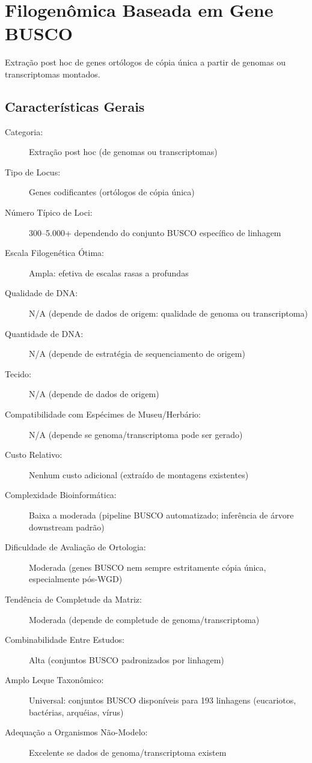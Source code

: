 \textcite{jansen2007, smith2015, twyford2017, li2021}

\section{Filogenômica Baseada em Gene BUSCO}

Extração post hoc de genes ortólogos de cópia única a partir de genomas ou transcriptomas montados.

\subsection{Características Gerais}

\begin{description}
\item[Categoria:] Extração post hoc (de genomas ou transcriptomas)
\item[Tipo de Locus:] Genes codificantes (ortólogos de cópia única)
\item[Número Típico de Loci:] 300--5.000+ dependendo do conjunto BUSCO específico de linhagem
\item[Escala Filogenética Ótima:] Ampla: efetiva de escalas rasas a profundas
\item[Qualidade de DNA:] N/A (depende de dados de origem: qualidade de genoma ou transcriptoma)
\item[Quantidade de DNA:] N/A (depende de estratégia de sequenciamento de origem)
\item[Tecido:] N/A (depende de dados de origem)
\item[Compatibilidade com Espécimes de Museu/Herbário:] N/A (depende se genoma/transcriptoma pode ser gerado)
\item[Custo Relativo:] Nenhum custo adicional (extraído de montagens existentes)
\item[Complexidade Bioinformática:] Baixa a moderada (pipeline BUSCO automatizado; inferência de árvore downstream padrão)
\item[Dificuldade de Avaliação de Ortologia:] Moderada (genes BUSCO nem sempre estritamente cópia única, especialmente pós-WGD)
\item[Tendência de Completude da Matriz:] Moderada (depende de completude de genoma/transcriptoma)
\item[Combinabilidade Entre Estudos:] Alta (conjuntos BUSCO padronizados por linhagem)
\item[Amplo Leque Taxonômico:] Universal: conjuntos BUSCO disponíveis para 193 linhagens (eucariotos, bactérias, arquéias, vírus)
\item[Adequação a Organismos Não-Modelo:] Excelente se dados de genoma/transcriptoma existem
\end{description}

